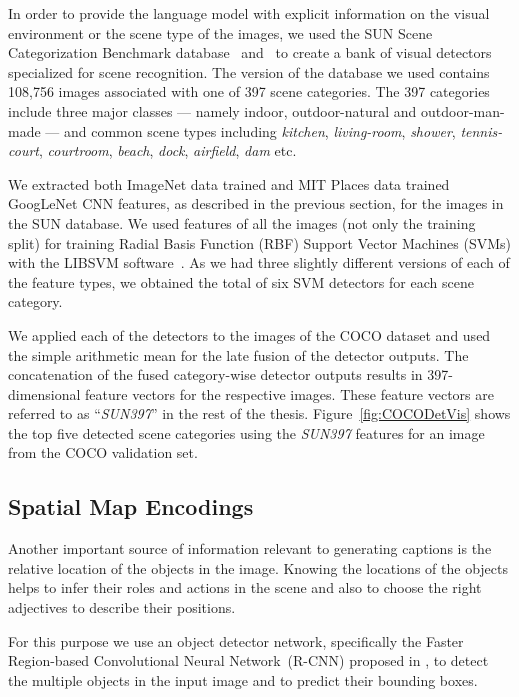 In order to provide the language model with explicit information on the visual
environment or the scene type of the images, we used the SUN Scene
Categorization Benchmark database~\cite{Xiao2010} and~\cite{Xiao2014} to create
a bank of visual detectors specialized for scene recognition.
The version of the database we used contains 108,756 images associated with one
of 397 scene categories.
The 397 categories include three major classes --- namely indoor, outdoor-natural
and outdoor-man-made --- and common scene types including \emph{kitchen},
\emph{living-room}, \emph{shower}, \emph{tennis-court}, \emph{courtroom},
\emph{beach}, \emph{dock}, \emph{airfield}, \emph{dam} etc. 

We extracted both ImageNet data trained and MIT Places data trained GoogLeNet
CNN features, as described in the previous section, for the images in the SUN
database.
We used features of all the images (not only the training split) for
training Radial Basis Function (RBF) Support Vector Machines (SVMs) with the
LIBSVM software~\cite{LIBSVM}.
As we had three slightly different versions of each of the feature types, we
obtained the total of six SVM detectors for each scene category.

We applied each of the detectors to the images of the COCO dataset and used the
simple arithmetic mean for the late fusion of the detector outputs.
The concatenation of the fused category-wise detector outputs results in
397-dimensional feature vectors for the respective images.
These feature vectors are referred to as ``\emph{SUN397}'' in the rest of the
thesis.
Figure~\ref{fig:COCODetVis} shows the top five detected scene categories using
the \emph{SUN397} features for an image from the COCO validation set.

\subsection{Spatial Map Encodings}
\label{sec:frcnnfeat}
Another important source of information relevant to generating captions is the
relative location of the objects in the image. 
Knowing the locations of the objects helps to infer their roles and actions in
the scene and also to choose the right adjectives to describe their positions.

For this purpose we use an object detector network, specifically the Faster
Region-based Convolutional Neural Network~(R-CNN) proposed in
\cite{ren15fasterrcnn}, to detect the multiple objects in the input image and to
predict their bounding boxes.

